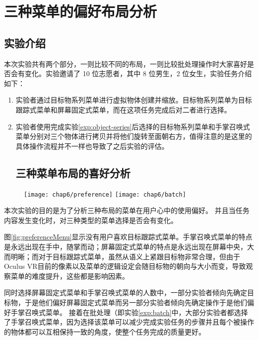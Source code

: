 \section{三种菜单的偏好布局分析}

\subsection{实验介绍}
本次实验共有两个部分，一则比较不同的布局，一则比较批处理操作时大家喜好是否会有变化。实验邀请了 10 位志愿者，其中 8 位男生，2 位女生，实验任务介绍如下：
\begin{enumerate}
\item 实验者通过目标物系列菜单进行虚拟物体创建并缩放。目标物系列菜单为目标跟踪式菜单和屏幕固定式菜单，而在这项任务完成后对二者进行选择。
\label{exp:object-series}
\item 实验者使用完成实验\ref{exp:object-series}后选择的目标物系列菜单和手掌召唤式菜单分别对三个物体进行拷贝并将他们旋转至面朝右方，值得注意的是这里的具体操作流程并不一样也导致了之后实验的评估。
\label{exp:batch}

\subsection{三种菜单布局的喜好分析}
\end{enumerate}
\begin{figure}[!htp]
  \centering
  \texttt{[image: chap6/preference]}
  \hspace{1cm}
  \texttt{[image: chap6/batch]}
\end{figure}

本次实验的目的是为了分析三种布局的菜单在用户心中的使用偏好。
并且当任务内容发生变化时，对三种类型的菜单选择是否会有变化。

图\ref{fig:preferenceMenu}显示没有用户喜欢目标跟踪式菜单。手掌召唤式菜单的特点是永远出现在手中，随掌而动；屏幕固定式菜单的特点是永远出现在屏幕中央，大而明晰；而对于目标跟踪式菜单，虽然从语义上紧跟目标物非常合理，但由于Oculus VR目前的像素以及菜单的逻辑设定会随目标物的朝向与大小而变，导致观察菜单的难度提升，这些都是影响因素。

同时选择屏幕固定式菜单和手掌召唤式菜单的人数中，一部分实验者倾向先确定目标物，于是他们偏好屏幕固定式菜单而另一部分实验者倾向先确定操作于是他们偏好手掌召唤式菜单。
接着在批处理（即实验\ref{exp:batch}中，大部分实验者都选择了手掌召唤式菜单，因为选择该菜单可以减少完成实验任务的步骤并且每个被操作的物体都可以互相保持一致的角度，使整个任务完成的质量更好。

